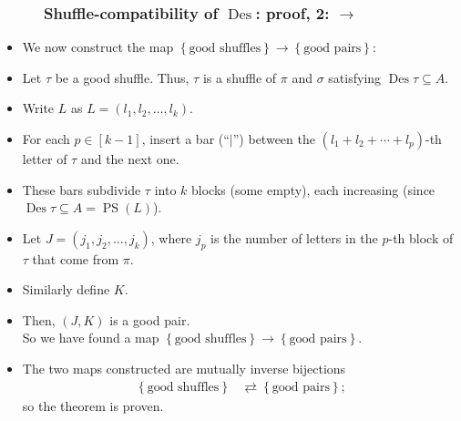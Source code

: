 \documentclass{beamer}
\newcommand{\Des}{\operatorname{Des}}
\newcommand{\PS}{\operatorname{PS}}
\newcommand{\fti}[1]{\frametitle{\ \ \ \ \ #1}}
\newcommand{\set}[1]{\left\{ #1 \right\}}
\newcommand{\tup}[1]{\left( #1 \right)}
\newcommand{\ive}[1]{\left[ #1 \right]}
\theoremstyle{plain}
\begin{document}
\begin{frame}
\begin{itemize}
\end{itemize}

\vspace{10cm}
\end{frame}

\begin{frame}
\fti{Shuffle-compatibility of $\Des$: proof, 2: $\rightarrow$}

\begin{itemize}

\item We now construct the map
      $\set{\text{good shuffles}} \to \set{\text{good pairs}}$:

\item Let $\tau$ be a good shuffle. Thus,
      $\tau$ is a shuffle of $\pi$ and $\sigma$ satisfying
      $\Des \tau \subseteq A$.

\pause

\item Write $L$ as $L = \tup{l_1, l_2, \ldots, l_k}$.

\pause

\item For each $p \in \ive{k-1}$, insert a bar (``$\mid$'') between
      the $\tup{l_1+l_2+\cdots+l_p}$-th letter of $\tau$
      and the next one.

\pause

\item These bars subdivide $\tau$ into $k$ blocks (some empty),
      each increasing (since $\Des \tau \subseteq A = \PS \tup{L}$).

\pause

\item Let $J = \tup{j_1, j_2, \ldots, j_k}$, where $j_p$ is
      the number of letters in the $p$-th block of $\tau$
      that come from $\pi$.

\pause

\item Similarly define $K$.

\pause

\item Then, $\tup{J, K}$ is a good pair.
      \pause \\
      So we have found a map
      $\set{\text{good shuffles}} \to \set{\text{good pairs}}$.

\pause

\item The two maps constructed are mutually inverse bijections
      \begin{align*}
               \set{\text{good shuffles}}
               &\rightleftarrows
               \set{\text{good pairs}} ;
      \end{align*}
      so the theorem is proven.

\end{itemize}

\vspace{10cm}
\end{frame}
\end{document}
